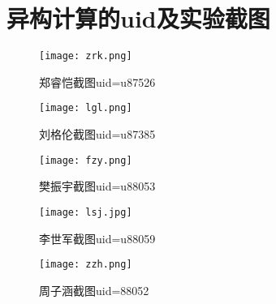 \chapter{异构计算的uid及实验截图}

\begin{figure}[htbp]
\centering
\texttt{[image: zrk.png]}
\caption{郑睿恺截图uid=u87526}\label{fig:zrk}
\vspace{\baselineskip}
\end{figure}
\begin{figure}[htbp]
\centering
\texttt{[image: lgl.png]}
\caption{刘格伦截图uid=u87385}\label{fig:lgl}
\vspace{\baselineskip}
\end{figure}
\begin{figure}[htbp]
\centering
\texttt{[image: fzy.png]}
\caption{樊振宇截图uid=u88053}\label{fig:fzy}
\vspace{\baselineskip}
\end{figure}    
\begin{figure}[htbp]
\centering
\texttt{[image: lsj.jpg]}
\caption{李世军截图uid=u88059}\label{fig:lsj}
\vspace{\baselineskip}
\end{figure}
\begin{figure}[htbp]
\centering
\texttt{[image: zzh.png]}
\caption{周子涵截图uid=88052}\label{fig:zzh}
\vspace{\baselineskip}
\end{figure}
